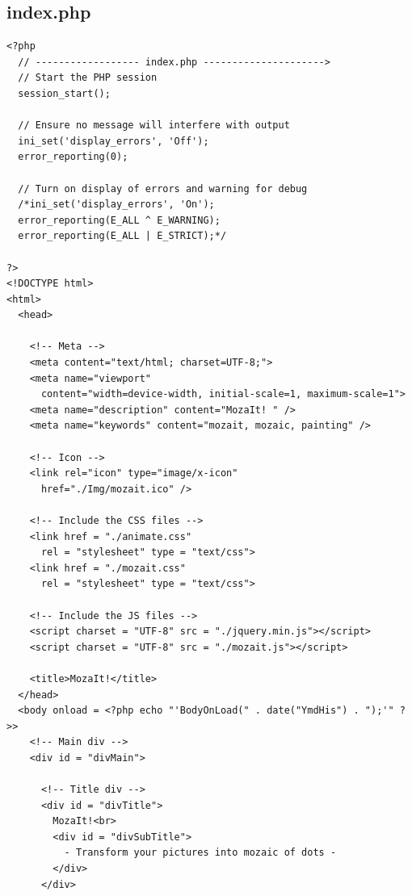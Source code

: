 \documentclass[12pt, a4paper]{article}
\begin{document}
\subsection{index.php}

\begin{scriptsize}
\begin{ttfamily}
\begin{lstlisting}
<?php 
  // ------------------ index.php --------------------->
  // Start the PHP session
  session_start();

  // Ensure no message will interfere with output
  ini_set('display_errors', 'Off');
  error_reporting(0);

  // Turn on display of errors and warning for debug
  /*ini_set('display_errors', 'On');
  error_reporting(E_ALL ^ E_WARNING);
  error_reporting(E_ALL | E_STRICT);*/

?>
<!DOCTYPE html>
<html>
  <head>

    <!-- Meta -->
    <meta content="text/html; charset=UTF-8;">
    <meta name="viewport" 
      content="width=device-width, initial-scale=1, maximum-scale=1">
    <meta name="description" content="MozaIt! " />
    <meta name="keywords" content="mozait, mozaic, painting" />
      
    <!-- Icon -->
    <link rel="icon" type="image/x-icon" 
      href="./Img/mozait.ico" />

    <!-- Include the CSS files -->
    <link href = "./animate.css" 
      rel = "stylesheet" type = "text/css">
    <link href = "./mozait.css" 
      rel = "stylesheet" type = "text/css"> 

    <!-- Include the JS files -->
    <script charset = "UTF-8" src = "./jquery.min.js"></script>
    <script charset = "UTF-8" src = "./mozait.js"></script>

    <title>MozaIt!</title>
  </head>
  <body onload = <?php echo "'BodyOnLoad(" . date("YmdHis") . ");'" ?>>
    <!-- Main div -->
    <div id = "divMain">
      
      <!-- Title div -->
      <div id = "divTitle">
        MozaIt!<br>
        <div id = "divSubTitle">
          - Transform your pictures into mozaic of dots -
        </div>
      </div>
      

\end{lstlisting}
\end{ttfamily}
\end{scriptsize}
\end{document}
